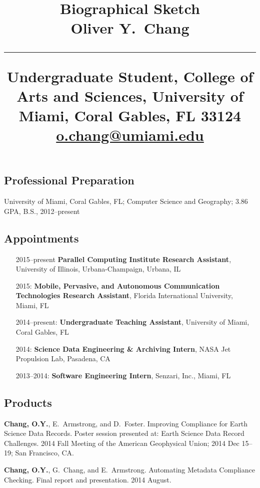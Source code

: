 \documentclass[svgnames,11pt]{article}
\title{%
        \vspace{-2\baselineskip}
            \normalsize
            Biographical Sketch\\
            \vspace{0.2\baselineskip}
            {\large\textbf{Oliver Y.~Chang}}\\
            \vspace{0.5\baselineskip}
            \hrule
            \vspace{0.5\baselineskip}
            Undergraduate Student, College of Arts and Sciences,
            University of Miami, Coral Gables, FL 33124\\
            \href{mailto:o.chang@umiami.edu}{o.chang@umiami.edu}
        \vspace{-1.5ex}
        }
\date{}
\author{}
\begin{document}
\maketitle
\vspace{-4\baselineskip}

\subsection{Professional Preparation}

    University of Miami, Coral Gables, FL;
        Computer Science and Geography;
        3.86 GPA, B.S., 2012--present

\subsection{Appointments}

\begin{itemize}[label={--9999:},leftmargin=*,itemsep=0pt]

    \item[2015--present]
        \textbf{Parallel Computing Institute Research Assistant},
        University of Illinois, Urbana-Champaign,
        Urbana, IL

    \item[2015:]
        \textbf{Mobile, Pervasive, and Autonomous Communication Technologies Research Assistant},
        Florida International University,
        Miami, FL

    \item[2014--present:]
        \textbf{Undergraduate Teaching Assistant},
        University of Miami,
        Coral Gables, FL

    \item[2014:]
        \textbf{Science Data Engineering \& Archiving Intern},
        NASA Jet Propulsion Lab,
        Pasadena, CA

    \item[2013--2014:]
        \textbf{Software Engineering Intern},
        Senzari, Inc.,
        Miami, FL

\end{itemize}

\subsection{Products}

\begin{bibenum}[itemsep=5pt]

    \item \textbf{Chang, O.Y.}, E.~Armstrong, and D.~Foster.
        Improving Compliance for Earth Science Data Records.
        Poster session presented at: Earth Science Data Record Challenges.
        2014 Fall Meeting of the American Geophysical Union; 2014 Dec 15--19; San Francisco, CA.

    \item \textbf{Chang, O.Y.}, G.~Chang, and E.~Armstrong.
        Automating Metadata Compliance Checking.
        Final report and presentation. 2014 August.

\end{bibenum}
\end{document}
